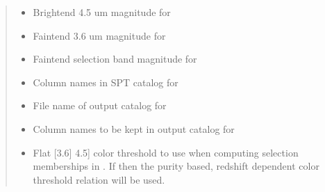 \documentclass[letterpaper,12pt,english]{sphinxmanual}
\begin{document}
\begin{fulllineitems}
\begin{fulllineitems}
\begin{quote}
\begin{description}
\begin{itemize}
\item {} 
\sphinxAtStartPar
{} \textendash{} Bright\sphinxhyphen{}end 4.5 um magnitude for {\hyperref[\detokenize{api/selector:SPTclIRAGN.Pipeline_functions.SelectIRAGN.object_selection}]{}}

\item {} 
\sphinxAtStartPar
{} \textendash{} Faint\sphinxhyphen{}end 3.6 um magnitude for {\hyperref[\detokenize{api/selector:SPTclIRAGN.Pipeline_functions.SelectIRAGN.object_selection}]{}}

\item {} 
\sphinxAtStartPar
{} \textendash{} Faint\sphinxhyphen{}end selection band magnitude for {\hyperref[\detokenize{api/selector:SPTclIRAGN.Pipeline_functions.SelectIRAGN.object_selection}]{}}

\item {} 
\sphinxAtStartPar
{} \textendash{} Column names in SPT catalog for {\hyperref[\detokenize{api/selector:SPTclIRAGN.Pipeline_functions.SelectIRAGN.catalog_merge}]{}}

\item {} 
\sphinxAtStartPar
{} \textendash{} File name of output catalog for {\hyperref[\detokenize{api/selector:SPTclIRAGN.Pipeline_functions.SelectIRAGN.final_catalogs}]{}}

\item {} 
\sphinxAtStartPar
{} \textendash{} Column names to be kept in output catalog for {\hyperref[\detokenize{api/selector:SPTclIRAGN.Pipeline_functions.SelectIRAGN.final_catalogs}]{}}

\item {} 
\sphinxAtStartPar
{} \textendash{} Flat {[}3.6{]} \sphinxhyphen{}{[}4.5{]} color threshold to use when computing selection memberships in .
If  then the purity based, redshift dependent color threshold relation will be used.


\end{itemize}
\end{description}
\end{quote}
\end{fulllineitems}
\end{fulllineitems}
\end{document}
